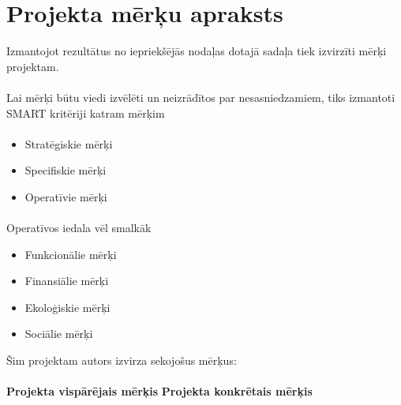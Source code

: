 \section{Projekta mērķu apraksts}
Izmantojot rezultātus no iepriekšējās nodaļas dotajā sadaļa tiek izvirzīti mērķi projektam.
\paragraph{}
Lai mērķi būtu viedi izvēlēti un neizrādītos par nesasniedzamiem, tiks izmantoti SMART 
kritēriji katram mērķim
\paragraph{}
\begin{itemize}
    \item Stratēgiskie mērķi
    \item Specifiskie mērķi
    \item Operatīvie mērķi
\end{itemize}
\paragraph{}
Operatīvos iedala vēl smalkāk
\begin{itemize}
    \item Funkcionālie mērķi
    \item Finansiālie mērķi
    \item Ekoloģiskie mērķi
    \item Sociālie mērķi
\end{itemize}
Šim projektam autors izvirza sekojošus mērķus:
\paragraph{}
\textbf{Projekta vispārējais mērķis} 
\textbf{Projekta konkrētais mērķis}
